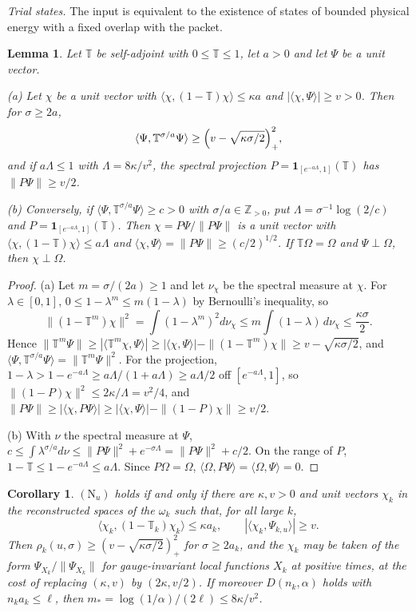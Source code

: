 \documentclass[aps,prd,twocolumn,superscriptaddress,nofootinbib,longbibliography,floatfix,amsmath,amssymb,10pt]{revtex4-2}
\newtheorem{lemma}[theorem]{Lemma}
\newtheorem{corollary}[theorem]{Corollary}
\theoremstyle{definition}
\theoremstyle{remark}
\newcommand{\Z}{\mathbb{Z}}
\newcommand{\ip}[2]{\langle #1,#2\rangle}
\begin{document}
\emph{Trial states.} The input is equivalent to the existence of states of
bounded physical energy with a fixed overlap with the packet.

\begin{lemma}\label{lem:trial}
Let $\mathbb T$ be self-adjoint with $0\le\mathbb T\le1$, let $a>0$ and let
$\Psi$ be a unit vector.

\textup{(a)} Let $\chi$ be a unit vector with $\ip\chi{(1-\mathbb T)\chi}\le
\kappa a$ and $|\ip\chi\Psi|\ge v>0$. Then for $\sigma\ge2a$,
\[
\ip\Psi{\mathbb T^{\sigma/a}\Psi}\ge\Bigl(v-\sqrt{\kappa\sigma/2}\Bigr)_+^2 ,
\]
and if $a\Lambda\le1$ with $\Lambda=8\kappa/v^2$, the spectral projection
$P=\mathbf1_{[e^{-a\Lambda},1]}(\mathbb T)$ has $\|P\Psi\|\ge v/2$.

\textup{(b)} Conversely, if $\ip\Psi{\mathbb T^{\sigma/a}\Psi}\ge c>0$ with
$\sigma/a\in\Z_{>0}$, put $\Lambda=\sigma^{-1}\log(2/c)$ and
$P=\mathbf1_{[e^{-a\Lambda},1]}(\mathbb T)$. Then $\chi=P\Psi/\|P\Psi\|$ is a
unit vector with $\ip\chi{(1-\mathbb T)\chi}\le a\Lambda$ and
$\ip\chi\Psi=\|P\Psi\|\ge(c/2)^{1/2}$. If $\mathbb T\Omega=\Omega$ and
$\Psi\perp\Omega$, then $\chi\perp\Omega$.
\end{lemma}

\begin{proof}
(a) Let $m=\sigma/(2a)\ge1$ and let $\nu_\chi$ be the spectral measure at
$\chi$. For $\lambda\in[0,1]$, $0\le1-\lambda^m\le m(1-\lambda)$ by
Bernoulli's inequality, so
\[
\|(1-\mathbb T^m)\chi\|^2=\int(1-\lambda^m)^2d\nu_\chi\le
m\int(1-\lambda)\,d\nu_\chi\le\frac{\kappa\sigma}2 .
\]
Hence $\|\mathbb T^m\Psi\|\ge|\ip{\mathbb T^m\chi}\Psi|\ge|\ip\chi\Psi|-
\|(1-\mathbb T^m)\chi\|\ge v-\sqrt{\kappa\sigma/2}$, and
$\ip\Psi{\mathbb T^{\sigma/a}\Psi}=\|\mathbb T^m\Psi\|^2$. For the projection,
$1-\lambda>1-e^{-a\Lambda}\ge a\Lambda/(1+a\Lambda)\ge a\Lambda/2$ off
$[e^{-a\Lambda},1]$, so $\|(1-P)\chi\|^2\le2\kappa/\Lambda=v^2/4$, and
$\|P\Psi\|\ge|\ip\chi{P\Psi}|\ge|\ip\chi\Psi|-\|(1-P)\chi\|\ge v/2$.

(b) With $\nu$ the spectral measure at $\Psi$,
$c\le\int\lambda^{\sigma/a}d\nu\le\|P\Psi\|^2+e^{-\sigma\Lambda}=\|P\Psi\|^2+
c/2$. On the range of $P$, $1-\mathbb T\le1-e^{-a\Lambda}\le a\Lambda$. Since
$P\Omega=\Omega$, $\ip\Omega{P\Psi}=\ip\Omega\Psi=0$.
\end{proof}

\begin{corollary}\label{cor:trial}
$(\mathrm N_u)$ holds if and only if there are $\kappa,v>0$ and unit vectors
$\chi_k$ in the reconstructed spaces of the $\omega_k$ such that, for all
large $k$,
\[
\ip{\chi_k}{(1-\mathbb T_k)\chi_k}\le\kappa a_k,\qquad
|\ip{\chi_k}{\Psi_{k,u}}|\ge v .
\]
Then $\rho_k(u,\sigma)\ge(v-\sqrt{\kappa\sigma/2})_+^2$ for $\sigma\ge2a_k$,
and the $\chi_k$ may be taken of the form $\Psi_{X_k}/\|\Psi_{X_k}\|$ for
gauge-invariant local functions $X_k$ at positive times, at the cost of
replacing $(\kappa,v)$ by $(2\kappa,v/2)$. If moreover $D(n_k,\alpha)$ holds
with $n_ka_k\le\ell$, then $m_*=\log(1/\alpha)/(2\ell)\le8\kappa/v^2$.
\end{corollary}
\end{document}
